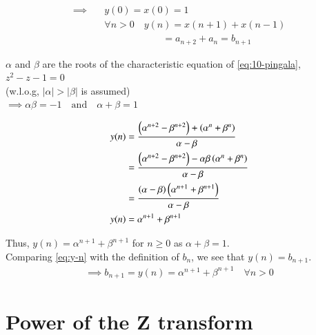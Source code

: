 \documentclass[journal,12pt,twocolumn]{IEEEtran}
\renewcommand\thesection{\arabic{section}}
\begin{document}
\begin{enumerate}[label=\thesection.\arabic*,ref=\thesection.\theenumi]
	\begin{align*}
		\implies \quad & y(0) = x(0) = 1 \\
			& \forall n > 0 \quad y(n) = x(n+1) + x(n-1) \\
			& \quad \quad \quad \quad \quad \quad = a_{n+2} + a_n = b_{n+1}
	\end{align*}

	$\alpha$ and $\beta$ are the roots of the characteristic equation of \eqref{eq:10-pingala}, $z^2 - z - 1 = 0$ \\
	(w.l.o.g, $|\alpha| > |\beta|$ is assumed) \\
	$\implies \alpha\beta = -1 \quad \text{and} \quad \alpha + \beta = 1$

	\begin{align}
		y(n) &= \frac{\left(\alpha^{n + 2} - \beta^{n + 2}\right) + \left(\alpha^{n} + \beta^{n}\right)}{\alpha - \beta} \nonumber \\
			&= \frac{\left(\alpha^{n + 2} - \beta^{n + 2}\right) - \alpha\beta\left(\alpha^{n} + \beta^{n}\right)}{\alpha - \beta} \nonumber \\
			&= \frac{\left(\alpha - \beta\right)\left(\alpha^{n + 1} + \beta^{n + 1}\right)}{\alpha - \beta} \nonumber \\
		y(n) &= \alpha^{n + 1} + \beta^{n + 1} \label{eq:y-n}
	\end{align}

	Thus, $y(n) = \alpha^{n + 1} + \beta^{n + 1}$ for $n \geq 0$ as $\alpha + \beta = 1$. \\
	Comparing \eqref{eq:y-n} with the definition of $b_n$, we see that $y(n) = b_{n + 1}$.
	\begin{align}
		\implies b_{n+1} = y(n) = \alpha^{n + 1} + \beta^{n + 1} \quad \forall n > 0 \label{op:3}
	\end{align}

\end{enumerate}



\section{Power of the Z transform}
\end{document}
